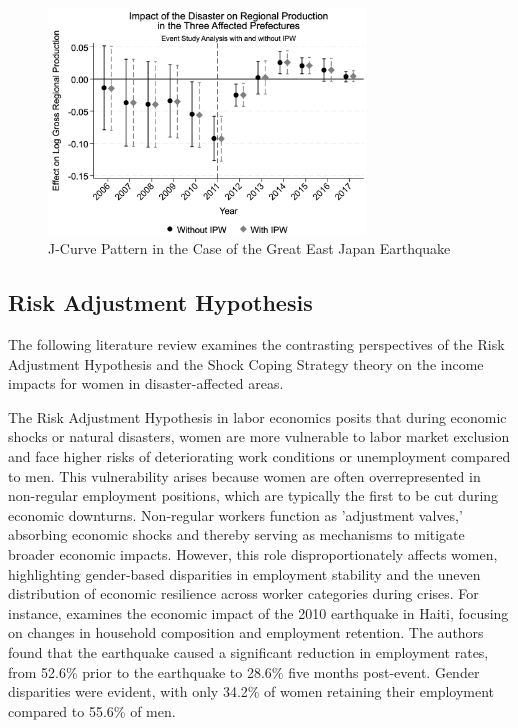 \documentclass[a4paper,12pt]{article}
\begin{document}
\begin{figure}[htbp]
    \centering
    \caption{J-Curve Pattern in the Case of the Great East Japan Earthquake}
    \label{fig:jcurve}
    \includegraphics[width=0.75\textwidth]{event_study_results.jpeg}
\end{figure}




\subsection{Risk Adjustment Hypothesis}
\label{sec5.1}

The following literature review examines the contrasting perspectives of the Risk Adjustment Hypothesis and the Shock Coping Strategy theory on the income impacts for women in disaster-affected areas.

The Risk Adjustment Hypothesis in labor economics posits that during economic shocks or natural disasters, women are more vulnerable to labor market exclusion and face higher risks of deteriorating work conditions or unemployment compared to men. This vulnerability arises because women are often overrepresented in non-regular employment positions, which are typically the first to be cut during economic downturns. Non-regular workers function as 'adjustment valves,' absorbing economic shocks and thereby serving as mechanisms to mitigate broader economic impacts. However, this role disproportionately affects women, highlighting gender-based disparities in employment stability and the uneven distribution of economic resilience across worker categories during crises. For instance, \citet{Kim2014ARetention} examines the economic impact of the 2010 earthquake in Haiti, focusing on changes in household composition and employment retention. The authors found that the earthquake caused a significant reduction in employment rates, from 52.6\% prior to the earthquake to 28.6\% five months post-event. Gender disparities were evident, with only 34.2\% of women retaining their employment compared to 55.6\% of men.
\end{document}
